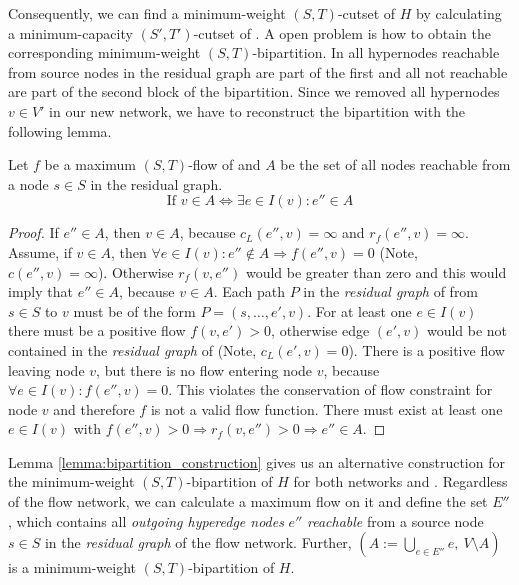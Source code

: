 Consequently, we can find a minimum-weight $(S,T)$-cutset of $H$ by calculating
a minimum-capacity $(S',T')$-cutset of . A open problem is how to obtain the 
corresponding minimum-weight $(S,T)$-bipartition. In  all hypernodes
reachable from source nodes in the residual graph are part of the first and 
all not reachable are part of the second block of the bipartition. Since we removed 
all hypernodes $v \in V'$ in our new network, we have to reconstruct the bipartition
with the following lemma.

\begin{lemma}
\label{lemma:bipartition_construction}
Let $f$ be a maximum $(S,T)$-flow  of  and $A$ be the set of all nodes reachable
from a node $s \in S$ in the residual graph.
\[ \text{If } v \in A \Leftrightarrow \exists e \in I(v): e'' \in A \]
\end{lemma}

\begin{proof}
If $e'' \in A$, then $v \in A$, because $c_L(e'',v) = \infty$ and $r_f(e'',v) = \infty$.
Assume, if $v \in A$, then $\forall e \in I(v): e'' \notin A \Rightarrow f(e'',v) = 0$ (Note, $c(e'',v) = \infty$). 
Otherwise $r_f(v, e'')$ would be greater than zero and this would imply that $e'' \in A$,
because $v \in A$. Each path $P$ in the \emph{residual graph} of  from $s \in S$ to $v$ must be of the 
form $P = (s,\ldots,e',v)$. For at least one $e \in I(v)$ there must be a positive flow $f(v,e') > 0$,
otherwise edge $(e',v)$ would be not contained in the \emph{residual graph} of  (Note, $c_L(e',v) = 0$).
There is a positive flow leaving node $v$, but there is no flow entering node $v$, because
$\forall e \in I(v): f(e'',v) = 0$. This violates the conservation of flow
constraint for node $v$ and therefore $f$ is not a valid flow function. There must exist at least one $e \in I(v)$
with $f(e'',v) > 0 \Rightarrow r_f(v,e'') > 0 \Rightarrow e'' \in A$.
\end{proof}

Lemma \ref{lemma:bipartition_construction} gives us an alternative construction for the minimum-weight $(S,T)$-bipartition
of $H$ for both networks  and . Regardless of the flow network, we can 
calculate a maximum flow on it and define the set $E''$, which contains all \emph{outgoing hyperedge
nodes} $e''$ \emph{reachable} from a source node $s \in S$ in the \emph{residual graph} of the flow network. 
Further, $(A := \bigcup_{e \in E''} e,\ V\setminus A)$ is a 
minimum-weight $(S,T)$-bipartition of $H$.


